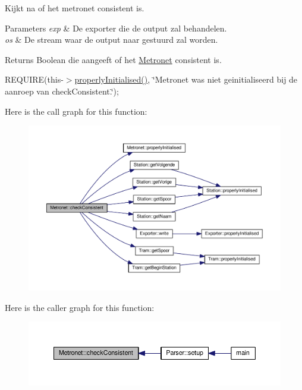 Kijkt na of het metronet consistent is. 


\begin{DoxyParams}{Parameters}
{\em exp} & De exporter die de output zal behandelen. \\
\hline
{\em os} & De stream waar de output naar gestuurd zal worden. \\
\hline
\end{DoxyParams}
\begin{DoxyReturn}{Returns}
Boolean die aangeeft of het \hyperlink{class_metronet}{Metronet} consistent is.
\end{DoxyReturn}
R\+E\+Q\+U\+I\+RE(this-\/$>$\hyperlink{class_metronet_a3d2adce29a947f162924279b766de645}{properly\+Initialised()}, \char`\"{}\+Metronet was niet geinitialiseerd bij de aanroep van check\+Consistent.\char`\"{});~\newline


Here is the call graph for this function\+:
\nopagebreak
\begin{figure}[H]
\begin{center}
\leavevmode
\includegraphics[width=350pt]{class_metronet_abd223e3d0f745e3460a247dc667fce69_cgraph}
\end{center}
\end{figure}




Here is the caller graph for this function\+:
\nopagebreak
\begin{figure}[H]
\begin{center}
\leavevmode
\includegraphics[width=350pt]{class_metronet_abd223e3d0f745e3460a247dc667fce69_icgraph}
\end{center}
\end{figure}


